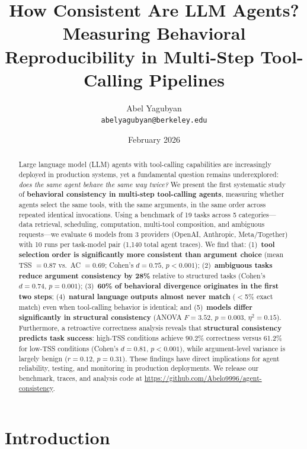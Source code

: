\documentclass[letterpaper]{article}
\title{How Consistent Are LLM Agents? \\
Measuring Behavioral Reproducibility in Multi-Step Tool-Calling Pipelines}
\author{
  Abel Yagubyan \\
  \texttt{abelyagubyan@berkeley.edu}
}
\date{February 2026}
\begin{document}
\maketitle

\begin{abstract}
Large language model (LLM) agents with tool-calling capabilities are increasingly deployed in production systems, yet a fundamental question remains underexplored: \textit{does the same agent behave the same way twice?} We present the first systematic study of \textbf{behavioral consistency in multi-step tool-calling agents}, measuring whether agents select the same tools, with the same arguments, in the same order across repeated identical invocations. Using a benchmark of 19 tasks across 5 categories---data retrieval, scheduling, computation, multi-tool composition, and ambiguous requests---we evaluate 6 models from 3 providers (OpenAI, Anthropic, Meta/Together) with 10 runs per task-model pair (1,140 total agent traces). We find that: (1)~\textbf{tool selection order is significantly more consistent than argument choice} (mean TSS $= 0.87$ vs.\ AC $= 0.69$; Cohen's $d = 0.75$, $p < 0.001$); (2)~\textbf{ambiguous tasks reduce argument consistency by 28\%} relative to structured tasks (Cohen's $d = 0.74$, $p = 0.001$); (3)~\textbf{60\% of behavioral divergence originates in the first two steps}; (4)~\textbf{natural language outputs almost never match} ($<$5\% exact match) even when tool-calling behavior is identical; and (5)~\textbf{models differ significantly in structural consistency} (ANOVA $F = 3.52$, $p = 0.003$, $\eta^2 = 0.15$). Furthermore, a retroactive correctness analysis reveals that \textbf{structural consistency predicts task success}: high-TSS conditions achieve 90.2\% correctness versus 61.2\% for low-TSS conditions (Cohen's $d = 0.81$, $p < 0.001$), while argument-level variance is largely benign ($r = 0.12$, $p = 0.31$). These findings have direct implications for agent reliability, testing, and monitoring in production deployments. We release our benchmark, traces, and analysis code at \url{https://github.com/Abelo9996/agent-consistency}.
\end{abstract}

\section{Introduction}
\end{document}
